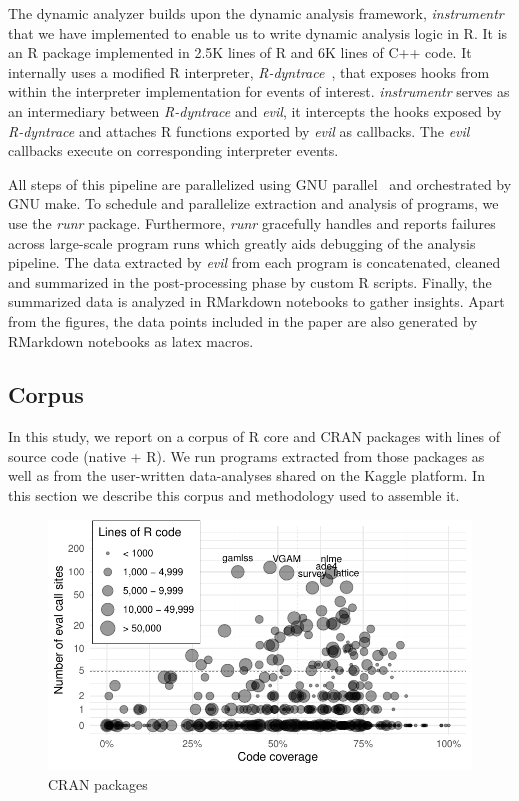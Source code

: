 \documentclass[a4paper,USenglish,cleveref, autoref, thm-restate]{lipics-v2019}
\newcommand{\evil}{\emph{evil}\xspace}
\newcommand{\instrumentr}{\emph{instrumentr}\xspace}
\newcommand{\rdyntrace}{\emph{R-dyntrace}\xspace}
\newcommand{\runr}{\emph{runr}\xspace}
\begin{document}
The dynamic analyzer builds upon the dynamic analysis framework, \instrumentr
that we have implemented to enable us to write dynamic analysis logic in R. It
is an R package implemented in 2.5K lines of R and 6K lines of C++ code. It
internally uses a modified R interpreter, \rdyntrace~\cite{oopsla19a}, that
exposes hooks from within the interpreter implementation for events of interest.
\instrumentr serves as an intermediary between \rdyntrace and \evil, it
intercepts the hooks exposed by \rdyntrace and attaches R functions exported by
\evil as callbacks. The \evil callbacks execute on corresponding interpreter
events.

All steps of this pipeline are parallelized using GNU
parallel~\cite{GNUparallel} and orchestrated by GNU make. To schedule and
parallelize extraction and analysis of programs, we use the \runr
package. Furthermore, \runr gracefully handles and reports failures across
large-scale program runs which greatly aids debugging of the analysis
pipeline.  The data extracted by \evil from each program is concatenated,
cleaned and summarized in the post-processing phase by custom R
scripts. Finally, the summarized data is analyzed in RMarkdown notebooks to
gather insights. Apart from the figures, the data points included in the
paper are also generated by RMarkdown notebooks as latex macros.

\subsection{Corpus}

In this study, we report on a corpus of \CorpusCorePackages R core and
\CorpusPackages CRAN packages with \CorpusAllCodeRnd lines of source code
(native + R).  We run \CorpusAllProgramsRnd programs extracted from those
packages as well as from the user-written data-analyses shared on the Kaggle
platform. In this section we describe this corpus and methodology used to
assemble it.

\begin{figure}[!h]\centering\includegraphics[width=\linewidth]
  {corpus.pdf}\caption{CRAN packages}\label{fig:corpus}
\end{figure}
\end{document}
